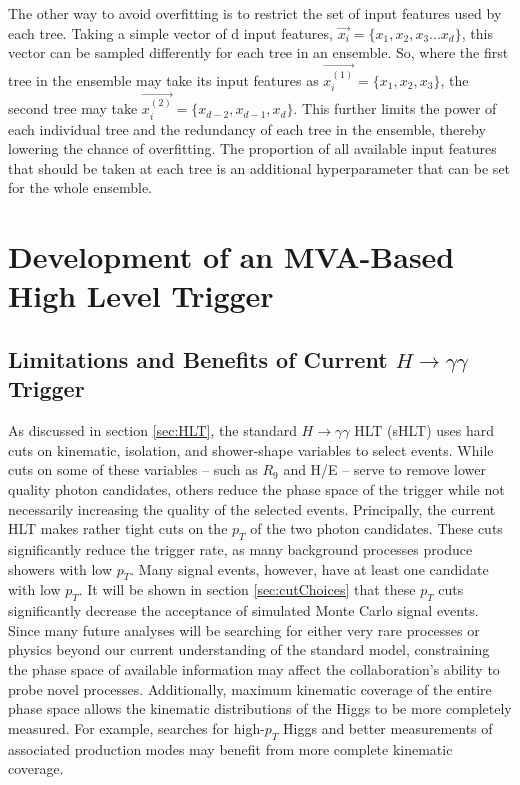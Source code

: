 \documentclass[12pt]{ucsddissertation}
\begin{document}
The other way to avoid overfitting is to restrict the set of input features used by each tree. Taking a simple vector of d input features, $\vec{x_i} = \{x_1,x_2,x_3 ... x_d\}$, this vector can be sampled differently for each tree in an ensemble. So, where the first tree in the ensemble may take its input features as $\vec{x^{(1)}_i} = \{x_1,x_2,x_3\}$, the second tree may take $\vec{x^{(2)}_i} = \{x_{d-2},x_{d-1},x_d\}$. This further limits the power of each individual tree and the redundancy of each tree in the ensemble, thereby lowering the chance of overfitting. The proportion of all available input features that should be taken at each tree is an additional hyperparameter that can be set for the whole ensemble. 

\chapter{Development of an MVA-Based High Level Trigger}\label{chapter:HLT}
\section{Limitations and Benefits of Current $H \rightarrow \gamma \gamma$ Trigger} 
As discussed in section \ref{sec:HLT}, the standard $H \rightarrow \gamma \gamma$ HLT (sHLT) uses hard cuts on kinematic, isolation, and shower-shape variables to select events. While cuts on some of these variables -- such as $R_{9}$ and H/E -- serve to remove lower quality photon candidates, others reduce the phase space of the trigger while not necessarily increasing the quality of the selected events. Principally, the current HLT makes rather tight cuts on the $p_{T}$ of the two photon candidates. These cuts significantly reduce the trigger rate, as many background processes produce showers with low $p_{T}$. Many signal events, however, have at least one candidate with low $p_{T}$. It will be shown in section \ref{sec:cutChoices} that these $p_{T}$ cuts significantly decrease the acceptance of simulated Monte Carlo signal events. Since many future analyses will be searching for either very rare processes or physics beyond our current understanding of the standard model, constraining the phase space of available information may affect the collaboration's ability to probe novel processes. Additionally, maximum kinematic coverage of the entire phase space allows the kinematic distributions of the Higgs to be more completely measured. For example, searches for high-$p_T$ Higgs and better measurements of associated production modes may benefit from more complete kinematic coverage.
\end{document}

